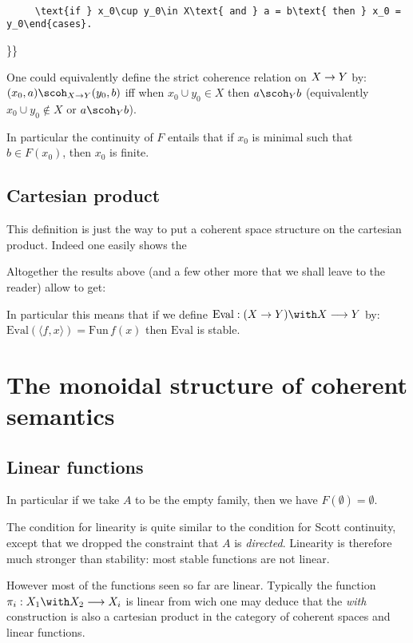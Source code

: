 \texttt{~~~~~~~~~~~~~~~~~~~~~~~~~~~~~~~~~~~~~~~~~~~~~~~~~~~~~~~~~~~~~~~~~~~~~~~~~~~\textbackslash{}text\{if~\}~x\_0\textbackslash{}cup~y\_0\textbackslash{}in~X\textbackslash{}text\{~and~\}~a~=~b\textbackslash{}text\{~then~\}~x\_0~=~y\_0\textbackslash{}end\{cases\}}\texttt{.}

\}\}

One could equivalently define the strict coherence relation on
\(X\rightarrow Y\) by: \((x_0,a)\scoh_{X\imp Y}(y_0, b)\) iff when
\(x_0\cup y_0\in X\) then \(a\scoh_Y b\) (equivalently
\(x_0\cup y_0\not\in X\) or \(a\scoh_Y b\)).

In particular the continuity of \(F\) entails that if \(x_0\) is minimal
such that \(b\in F(x_0)\), then \(x_0\) is finite.

\subsection{Cartesian product}\label{cartesian-product}

This definition is just the way to put a coherent space structure on the
cartesian product. Indeed one easily shows the

Altogether the results above (and a few other more that we shall leave
to the reader) allow to get:

In particular this means that if we define
\(\mathrm{Eval}:(X\imp Y)\with X\longrightarrow Y\) by:
\(\mathrm{Eval}(\langle f, x\rangle) = \mathrm{Fun}\,f(x)\) then
\(\mathrm{Eval}\) is stable.

\section{The monoidal structure of coherent semantics}\label{the-monoidal-structure-of-coherent-semantics}

\subsection{Linear functions}\label{linear-functions}

In particular if we take \(A\) to be the empty family, then we have
\(F(\emptyset) = \emptyset\).

The condition for linearity is quite similar to the condition for Scott
continuity, except that we dropped the constraint that \(A\) is
\emph{directed}. Linearity is therefore much stronger than stability:
most stable functions are not linear.

However most of the functions seen so far are linear. Typically the
function \(\pi_i:X_1\with X_2\longrightarrow X_i\) is linear from wich
one may deduce that the \emph{with} construction is also a cartesian
product in the category of coherent spaces and linear functions.


